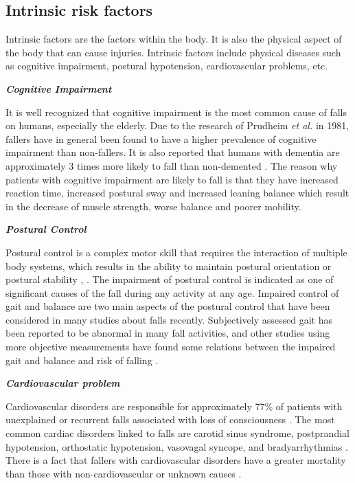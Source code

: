 \documentclass[letterpaper,12pt,titlepage,oneside,final]{book}
\begin{document}
\subsection{Intrinsic risk factors}
Intrinsic factors are the factors within the body. It is also the physical aspect of the body that can cause injuries. Intrinsic factors include physical diseases such as cognitive impairment, postural hypotension, cardiovascular problems, etc.\par
\vspace{0.3cm}
\textbf{\textit{Cognitive Impairment}}\par
It is well recognized that cognitive impairment is the most common cause of falls on humans, especially the elderly. Due to the research of Prudheim \textit{et al.} \cite{cognitive_1} in 1981, fallers have in general been found to have a higher prevalence of cognitive impairment than non-fallers. It is also reported that humans with dementia are approximately 3 times more likely to fall than non-demented \cite{cognitive_2}. The reason why patients with cognitive impairment are likely to fall is that they have increased reaction time, increased postural sway and increased leaning balance which result in the decrease of muscle strength, worse balance and poorer mobility. \par
\vspace{0.3cm}
\textbf{\textit{Postural Control}}\par
Postural control is a complex motor skill that requires the interaction of multiple body systems, which results in the ability to maintain postural orientation or postural stability \cite{postural_1}, \cite{postural_2}. The impairment of postural control is indicated as one of significant causes of the fall during any activity at any age. Impaired control of gait and balance are two main aspects of the postural control that have been considered in many studies about falls recently. Subjectively assessed gait has been reported to be abnormal in many fall activities, and other studies using more objective measurements have found some relations between the impaired gait and balance and risk of falling \cite{bibli_book}.

\vspace{0.3cm}
\textbf{\textit{Cardiovascular problem}}\par
Cardiovascular disorders are responsible for approximately 77\% of patients with unexplained or recurrent falls associated with loss of consciousness \cite{cardio_1}. The most common cardiac disorders linked to falls are carotid sinus syndrome, postprandial hypotension, orthostatic hypotension, vasovagal syncope, and bradyarrhythmias \cite{cause_cardio}. There is a fact that fallers with cardiovascular disorders have a greater mortality than those with non-cardiovascular or unknown causes \cite{cardio_2}.   
\end{document}
